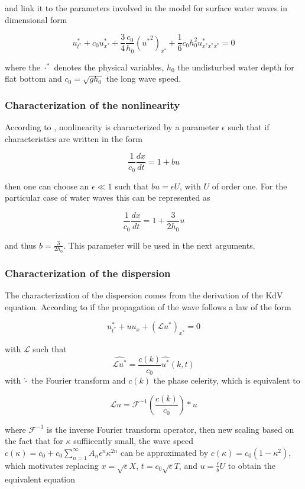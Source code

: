 \noindent and link it to the parameters involved in the model for surface water waves  in dimensional form \cite{Khorsand2014}

\begin{equation}
    u^*_{t^*} + c_0u^*_{x^*} + \frac{3}{4}\frac{c_0}{h_0}({u^*}^2)_{x^*} + \frac{1}{6}c_0h_0^2u^*_{x^*x^*x^*} = 0 
\end{equation}

\noindent where the $\cdot^*$ denotes the physical variables, $h_0$ the undisturbed water depth for flat bottom and $c_0 = \sqrt{gh_0}$  the long wave speed.

\subsubsection{Characterization of the nonlinearity}

\indent According to \cite{BBM1971}, nonlinearity is characterized by a parameter $\epsilon$ such that if characteristics are written in the form

$$ \frac{1}{c_0} \frac{dx}{dt} = 1+ bu$$

\noindent then one can choose an $\epsilon \ll 1$ such that $bu=\epsilon U$, with $U$ of order one. For the particular case of water waves this can be represented as

$$ \frac{1}{c_0} \frac{dx}{dt} = 1 + \frac{3}{2h_0}u$$

\noindent and thus $b = \frac{3}{2h_0}$. This parameter will be used in the next arguments.

\subsubsection{Characterization of the dispersion}

\noindent The characterization of the dispersion comes from the derivation of the KdV equation. According to \cite{BBM1971} if the propagation of the wave follows a law of the form

$$ u^*_{t^*} + uu_x+(\mathcal{L} u^*)_{x^*} = 0$$

\indent with $\mathcal{L}$ such that $$ \hat{\mathcal{L}u^*} = \frac{c(k)}{c_0} \hat{u^*}(k,t)$$ with $\hat \cdot$ the Fourier transform and $c(k)$ the phase celerity, which is equivalent to 

$$ \mathcal{L} u = \mathcal{F}^{-1}\left(\frac{c(k)}{c_0}\right) * u$$ 

\noindent where $\mathcal{F}^{-1}$ is the inverse Fourier transform operator, then new scaling based on the fact that for $\kappa$ suffiicently small, the wave speed $c(\kappa) = c_0 + c_0 \sum_{n=1}^{\infty}A_n\epsilon^n\kappa^{2n}$ can be approximated by $c(\kappa) = c_0(1-\kappa^2)$, which motivates replacing $x=\sqrt{\epsilon} X$, $t =c_0 \sqrt{\epsilon} T$, and $u = \frac{\epsilon}{ b} U$ to obtain the equivalent equation 

